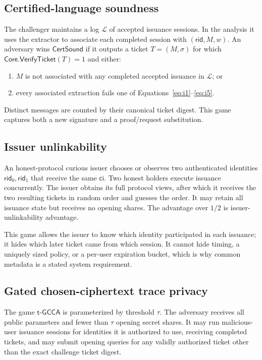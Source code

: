 \documentclass[11pt]{article}
\newcommand{\Core}{\mathsf{Core}}
\newcommand{\rid}{\mathsf{rid}}
\begin{document}
\subsection{Certified-language soundness}

The challenger maintains a log $\mathcal L$ of accepted issuance sessions.  In
the analysis it uses the extractor to associate each completed session with
$(\rid,M,w)$.  An adversary wins $\mathsf{CertSound}$ if it outputs a ticket
$T=(M,\sigma)$ for which $\Core.\mathsf{VerifyTicket}(T)=1$ and either:
\begin{enumerate}[label=(\alph*),leftmargin=*]
  \item $M$ is not associated with any completed accepted issuance in
  $\mathcal L$; or
  \item every associated extraction fails one of
  Equations~\eqref{eq:i1}--\eqref{eq:i5}.
\end{enumerate}

Distinct messages are counted by their canonical ticket digest.  This game
captures both a new signature and a proof/request substitution.

\subsection{Issuer unlinkability}

An honest-protocol curious issuer chooses or observes two authenticated
identities $\rid_0,\rid_1$ that receive the same $\mathsf{ci}$.  Two honest
holders execute issuance concurrently.  The issuer obtains its full protocol
views, after which it receives the two resulting tickets in random order and
guesses the order.  It may retain all issuance state but receives no opening
shares.  The advantage over $1/2$ is issuer-unlinkability advantage.

This game allows the issuer to know which identity participated in each
issuance; it hides which later ticket came from which session.  It cannot hide
timing, a uniquely sized policy, or a per-user expiration bucket, which is why
common metadata is a stated system requirement.

\subsection{Gated chosen-ciphertext trace privacy}\label{sec:gcca-game}

The game $\mathsf{t\text{-}GCCA}$ is parameterized by threshold $\tau$.
The adversary receives all public parameters and fewer than $\tau$ opening
secret shares.  It may run malicious-user issuance sessions for identities it
is authorized to use, receiving completed tickets, and may submit opening
queries for any validly authorized ticket other than the exact challenge ticket
digest.
\end{document}
